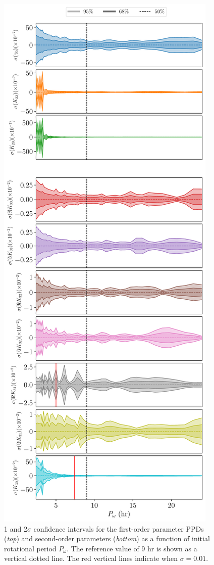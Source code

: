 \documentclass[fleqn,usenatbib]{mnras}
\begin{document}
\begin{figure}
  \centering
  \includegraphics[height=0.89\textheight]{figs/scan-period.pdf}
  \caption{1 and 2$\sigma$ confidence intervals for the first-order parameter PPDs (\textit{top}) and second-order parameters (\textit{bottom}) as a function of initial rotational period $P_\omega$. The reference value of 9 hr is shown as a vertical dotted line. The red vertical lines indicate when $\sigma = 0.01$.}
  \label{fig:scan-period}
\end{figure}
\end{document}
